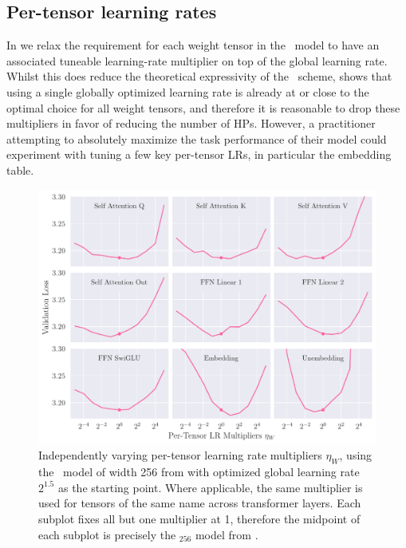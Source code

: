 \FloatBarrier
\clearpage

\subsection{Per-tensor learning rates}\label{app:umup_lr_mults}

In  we relax the requirement for each weight tensor in the \umup\ model to have an associated tuneable learning-rate multiplier on top of the global learning rate. Whilst this does reduce the theoretical expressivity of the \umup\ scheme,  shows that using a single globally optimized learning rate is already at or close to the optimal choice for all weight tensors, and therefore it is reasonable to drop these multipliers in favor of reducing the number of HPs. However, a practitioner attempting to absolutely maximize the task performance of their model could experiment with tuning a few key per-tensor LRs, in particular the embedding table.

\begin{figure}[h]
    \centering
    \includegraphics[width=\textwidth]{arXiv/figures/fig_LR_mults.pdf}
    \caption{Independently varying per-tensor learning rate multipliers $\eta_W$, using the \umup\ model of width 256 from  with optimized global learning rate $2^{1.5}$ as the starting point. Where applicable, the same multiplier is used for tensors of the same name across transformer layers. Each subplot fixes all but one multiplier at 1, therefore the midpoint of each subplot is precisely the \umup{}$_{256}$ model from .}
    \label{fig:additional_experiments:lr_mults}
\end{figure}

